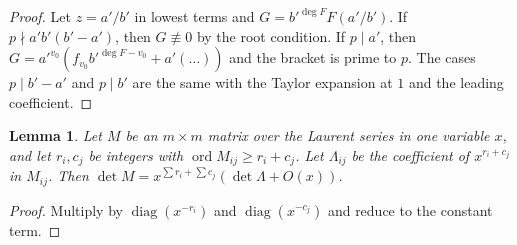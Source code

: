 \documentclass[11pt]{amsart}
\newtheorem{lemma}[theorem]{Lemma}
\theoremstyle{definition}
\theoremstyle{remark}
\numberwithin{equation}{section}
\begin{document}
\begin{proof}
Let $z=a'/b'$ in lowest terms and $G=b'^{\deg F}F(a'/b')$. If $p\nmid a'b'(b'-a')$, then $G\not\equiv0$ by the root
condition. If $p\mid a'$, then $G=a'^{v_0}(f_{v_0}b'^{\deg F-v_0}+a'(\dots))$ and the bracket is prime to $p$. The cases
$p\mid b'-a'$ and $p\mid b'$ are the same with the Taylor expansion at $1$ and the leading coefficient.
\end{proof}

\begin{lemma}\label{lem:potentials}
Let $M$ be an $m\times m$ matrix over the Laurent series in one variable $x$, and let $r_i,c_j$ be integers with
$\operatorname{ord}M_{ij}\ge r_i+c_j$. Let $\Lambda_{ij}$ be the coefficient of $x^{r_i+c_j}$ in $M_{ij}$. Then
$\det M=x^{\sum r_i+\sum c_j}(\det\Lambda+O(x))$.
\end{lemma}

\begin{proof}
Multiply by $\operatorname{diag}(x^{-r_i})$ and $\operatorname{diag}(x^{-c_j})$ and reduce to the constant term.
\end{proof}
\end{document}
